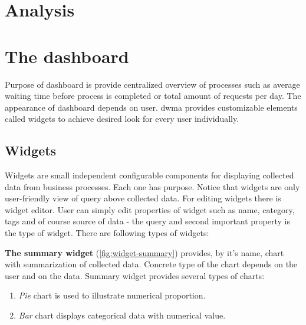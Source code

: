 \documentclass[thesis=B,english]{FITthesis}[2012/06/26]
\newcommand{\todo}[1]{\textcolor{red}{\textbf{[#1]}}}
\begin{document}
   
    
    
    \section{Analysis}    

   

	\section{The dashboard}
    Purpose of dashboard is provide centralized overview of processes such as average waiting time before process is completed or total amount of requests per day. The appearance of dashboard depends on user. \gls{dwma} provides customizable elements called widgets to achieve desired look for every user individually.

    \subsection{Widgets}  
     Widgets are small independent configurable components for displaying collected data from business processes. Each one has purpose. Notice that widgets are only user-friendly view of query above collected data. For editing widgets there is widget editor. User can simply edit properties of widget such as name, category, tags and of course source of data - the query and second important property is the type of widget. There are following types of widgets:
     
     \textbf{The summary widget} (\cref{fig:widget-summary}) provides, by it's name, chart with summarization of collected data. Concrete type of the chart depends on the user and on the data. Summary widget provides several types of charts:
     
     \begin{enumerate}
    	\item \textit{Pie} chart is used to illustrate numerical proportion.         
        \item  \textit{Bar} chart displays categorical data with numerical value.
    \end{enumerate}
      
\end{document}
